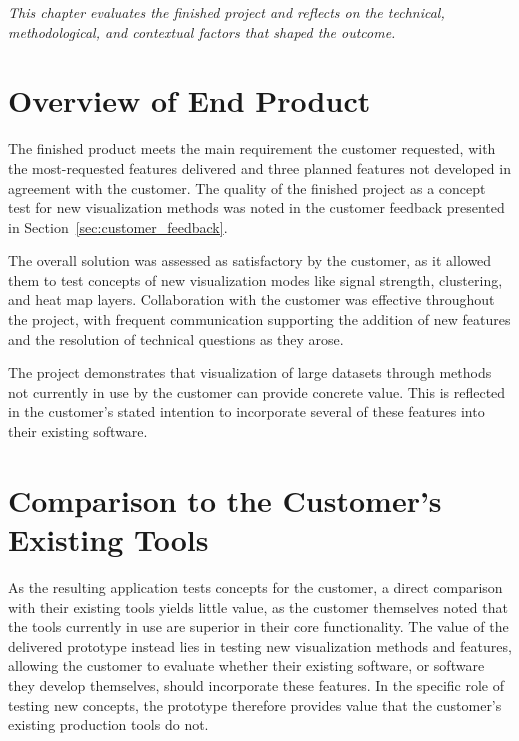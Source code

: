 \textit{This chapter evaluates the finished project and reflects on the technical, methodological, and contextual factors that shaped the outcome.}

\section{Overview of End Product}

The finished product meets the main requirement the customer requested, with the most-requested features delivered and three planned features not developed in agreement with the customer. The quality of the finished project as a concept test for new visualization methods was noted in the customer feedback presented in Section~\ref{sec:customer_feedback}.

The overall solution was assessed as satisfactory by the customer, as it allowed them to test concepts of new visualization modes like signal strength, clustering, and heat map layers. Collaboration with the customer was effective throughout the project, with frequent communication supporting the addition of new features and the resolution of technical questions as they arose.

The project demonstrates that visualization of large datasets through methods not currently in use by the customer can provide concrete value. This is reflected in the customer's stated intention to incorporate several of these features into their existing software.

\section{Comparison to the Customer's Existing Tools}
As the resulting application tests concepts for the customer, a direct comparison with their existing tools yields little value, as the customer themselves noted that the tools currently in use are superior in their core functionality. The value of the delivered prototype instead lies in testing new visualization methods and features, allowing the customer to evaluate whether their existing software, or software they develop themselves, should incorporate these features. In the specific role of testing new concepts, the prototype therefore provides value that the customer's existing production tools do not.


